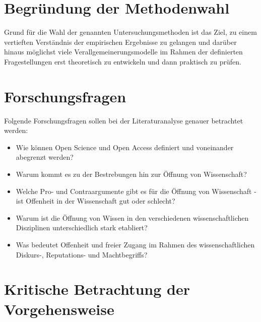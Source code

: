 \section{Begründung der Methodenwahl} 

Grund für die Wahl der genannten Untersuchungsmethoden ist das Ziel, zu einem vertieften Verständnis der empirischen Ergebnisse zu gelangen und darüber hinaus möglichst viele Verallgemeinerungsmodelle im Rahmen der definierten Fragestellungen erst theoretisch zu entwickeln und dann praktisch zu prüfen.

\section{Forschungsfragen} 
Folgende Forschungsfragen sollen bei der Literaturanalyse genauer betrachtet werden:
\begin{itemize}
\item Wie können Open Science und Open Access definiert und voneinander abegrenzt werden? 
\item Warum kommt es zu der Bestrebungen hin zur Öffnung von Wissenschaft? 
\item Welche Pro- und Contraargumente gibt es für die Öffnung von Wissenschaft - ist Offenheit in der Wissenschaft gut oder schlecht? 
\item Warum ist die Öffnung von Wissen in den verschiedenen wissenschaftlichen Disziplinen unterschiedlich stark etabliert? 
\item Was bedeutet Offenheit und freier Zugang im Rahmen des wissenschaftlichen Diskurs-, Reputations- und Machtbegriffs?
\end{itemize}	

\section{Kritische Betrachtung der Vorgehensweise} 
